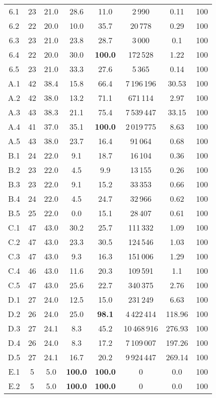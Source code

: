 {\begin{longtable}{@{\extracolsep{0pt}}cccccccc}
	6.1 & 23 & 21.0 & 28.6 & 11.0 & 2\,990 & 0.11 & 100 \\
	6.2 & 22 & 20.0 & 10.0 & 35.7 & 20\,778 & 0.29 & 100 \\
	6.3 & 23 & 21.0 & 23.8 & 28.7 & 3\,000 & 0.1 & 100 \\
	6.4 & 22 & 20.0 & 30.0 & \textbf{100.0} & 172\,528 & 1.22 & 100 \\
	6.5 & 23 & 21.0 & 33.3 & 27.6 & 5\,365 & 0.14 & 100 \\
	A.1 & 42 & 38.4 & 15.8 & 66.4 & 7\,196\,196 & 30.53 & 100 \\
	A.2 & 42 & 38.0 & 13.2 & 71.1 & 671\,114 & 2.97 & 100 \\
	A.3 & 43 & 38.3 & 21.1 & 75.4 & 7\,539\,447 & 33.15 & 100 \\
	A.4 & 41 & 37.0 & 35.1 & \textbf{100.0} & 2\,019\,775 & 8.63 & 100 \\
	A.5 & 43 & 38.0 & 23.7 & 16.4 & 91\,064 & 0.68 & 100 \\
	B.1 & 24 & 22.0 & 9.1 & 18.7 & 16\,104 & 0.36 & 100 \\
	B.2 & 23 & 22.0 & 4.5 & 9.9 & 13\,155 & 0.26 & 100 \\
	B.3 & 23 & 22.0 & 9.1 & 15.2 & 33\,353 & 0.66 & 100 \\
	B.4 & 24 & 22.0 & 4.5 & 24.7 & 32\,966 & 0.62 & 100 \\
	B.5 & 25 & 22.0 & 0.0 & 15.1 & 28\,407 & 0.61 & 100 \\
	C.1 & 47 & 43.0 & 30.2 & 25.7 & 111\,332 & 1.09 & 100 \\
	C.2 & 47 & 43.0 & 23.3 & 30.5 & 124\,546 & 1.03 & 100 \\
	C.3 & 47 & 43.0 & 9.3 & 16.3 & 151\,006 & 1.29 & 100 \\
	C.4 & 46 & 43.0 & 11.6 & 20.3 & 109\,591 & 1.1 & 100 \\
	C.5 & 47 & 43.0 & 25.6 & 22.7 & 340\,375 & 2.76 & 100 \\
	D.1 & 27 & 24.0 & 12.5 & 15.0 & 231\,249 & 6.63 & 100 \\
	D.2 & 26 & 24.0 & 25.0 & \textbf{98.1} & 4\,422\,414 & 118.96 & 100 \\
	D.3 & 27 & 24.1 & 8.3 & 45.2 & 10\,468\,916 & 276.93 & 100 \\
	D.4 & 26 & 24.0 & 8.3 & 17.2 & 7\,109\,007 & 197.26 & 100 \\
	D.5 & 27 & 24.1 & 16.7 & 20.2 & 9\,924\,447 & 269.14 & 100 \\
	E.1 & 5 & 5.0 & \textbf{100.0} & \textbf{100.0} & 0 & 0.0 & 100 \\
	E.2 & 5 & 5.0 & \textbf{100.0} & \textbf{100.0} & 0 & 0.0 & 100 \\

\end{longtable}}
